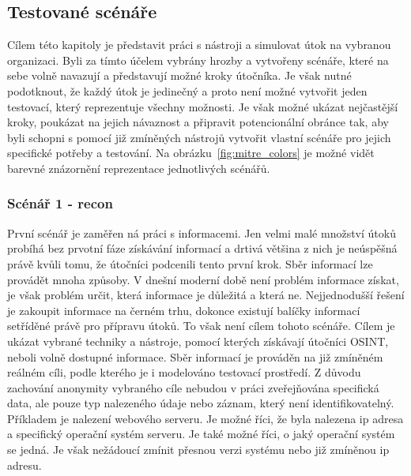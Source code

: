 \subsection{Testované scénáře}\label{subsec:testovane-scenare}
Cílem této kapitoly je představit práci s nástroji a simulovat útok na vybranou organizaci.
Byli za tímto účelem vybrány hrozby a vytvořeny scénáře, které na sebe volně navazují a představují možné kroky útočníka.
Je však nutné podotknout, že každý útok je jedinečný a proto není možné vytvořit jeden testovací, který reprezentuje všechny možnosti.
Je však možné ukázat nejčastější kroky, poukázat na jejich návaznost a připravit potencionální obránce tak, aby byli schopni s pomocí již zmíněných nástrojů vytvořit vlastní scénáře pro jejich specifické potřeby a testování.
Na obrázku~\ref{fig:mitre_colors} je možné vidět barevné znázornění reprezentace jednotlivých scénářů.



\subsubsection{Scénář 1 - recon}
První scénář je zaměřen ná práci s informacemi.
Jen velmi malé množství útoků probíhá bez prvotní fáze získávání informací a drtivá většina z nich je neúspěšná právě kvůli tomu, že útočníci podcenili tento první krok.
Sběr informací lze provádět mnoha způsoby.
V dnešní moderní době není problém informace získat, je však problém určit, která informace je důležitá a která ne.
Nejjednodušší řešení je zakoupit informace na černém trhu, dokonce existují balíčky informací setříděné právě pro přípravu útoků.
To však není cílem tohoto scénáře.
Cílem je ukázat vybrané techniky a nástroje, pomocí kterých získávají útočníci \ac{OSINT}, neboli volně dostupné informace.
Sběr informací je prováděn na již zmíněném reálném cíli, podle kterého je i modelováno testovací prostředí.
Z důvodu zachování anonymity vybraného cíle nebudou v práci zveřejňována specifická data, ale pouze typ nalezeného údaje nebo záznam, který není identifikovatelný.
Příkladem je nalezení webového serveru.
Je možné říci, že byla nalezena ip adresa a specifický operační systém serveru.
Je také možné říci, o jaký operační systém se jedná.
Je však nežádoucí zmínit přesnou verzi systému nebo již zmíněnou ip adresu.


